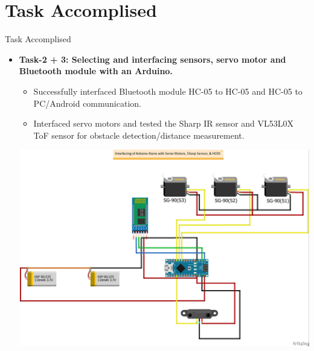 \documentclass[10pt, a4paper]{beamer}
\begin{document}
\section{Task Accomplised}
\begin{frame}{Task Accomplised}
	\begin{itemize}
\item \textbf{Task-2 + 3: Selecting and interfacing sensors, servo motor and Bluetooth module with an Arduino.}
		\begin{itemize}
		  \item Successfully interfaced Bluetooth module HC-05 to HC-05 and HC-05 to PC/Android communication.
		  \item Interfaced servo motors and tested the Sharp IR sensor and VL53L0X ToF sensor for obstacle detection/distance measurement.
           \end{itemize}
           \centering\includegraphics[scale=0.2]{Arduino_interfacing.jpg}
	\end{itemize}
\end{frame}
\end{document}
